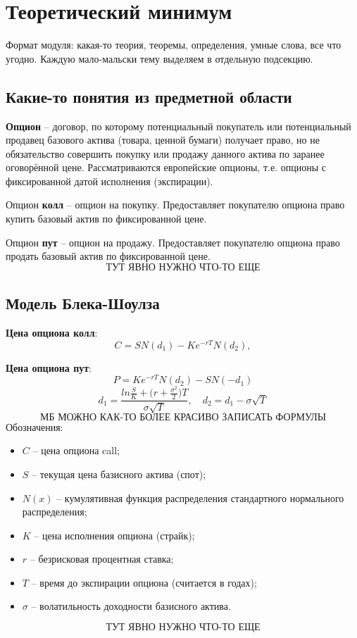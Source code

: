 \documentclass{article}
\begin{document}
\section{Теоретический минимум}

Формат модуля: какая-то теория, теоремы, определения, умные слова, все что угодно. Каждую мало-мальски тему выделяем в отдельную подсекцию.

\subsection{Какие-то понятия из предметной области}
\textbf{Опцион} --  договор, по которому потенциальный покупатель или потенциальный продавец базового актива (товара, ценной бумаги) получает право, но не обязательство совершить покупку или продажу данного актива по заранее оговорённой цене. Рассматриваются европейские опционы, т.е. опционы с фиксированной датой исполнения (экспирации).

Опцион \textbf{колл} -- опцион на покупку. Предоставляет покупателю опциона право купить базовый актив по фиксированной цене.

Опцион \textbf{пут} -- опцион на продажу. Предоставляет покупателю опциона право продать базовый актив по фиксированной цене.
\[
\textbf{ТУТ ЯВНО НУЖНО ЧТО-ТО  ЕЩЕ}
\]
\newpage
\subsection{Модель Блека-Шоулза}
\textbf{Цена опциона колл}:
\[
C = SN(d_1) - Ke^{-rT}N(d_2),
\]

\textbf{Цена опциона пут}:
\[
P= Ke^{-rT}N(d_2) - SN(-d_1)
\]
\[
d_1 = \frac{ln\frac{S}{K}+ \big(r + \frac{\sigma^2}{2}\big)T}{\sigma\sqrt{T}}, \quad d_2 = d_1 - \sigma\sqrt{T}
\]
\[
\textbf{МБ МОЖНО КАК-ТО БОЛЕЕ КРАСИВО ЗАПИСАТЬ ФОРМУЛЫ}
\]
Обозначения:
\begin{itemize}
    \item $C$ -- цена опциона call;
    \item $S$ -- текущая цена базисного актива (спот);
    \item $N(x)$ -- кумулятивная функция распределения стандартного нормального распределения;
    \item $K$ -- цена исполнения опциона (страйк);
    \item $r$ -- безрисковая процентная ставка;
    \item $T$ -- время до экспирации опциона (считается в годах);
    \item $\sigma$ -- волатильность доходности базисного актива.
\end{itemize}
\[
\textbf{ТУТ ЯВНО НУЖНО ЧТО-ТО  ЕЩЕ}
\]
\newpage
\end{document}
